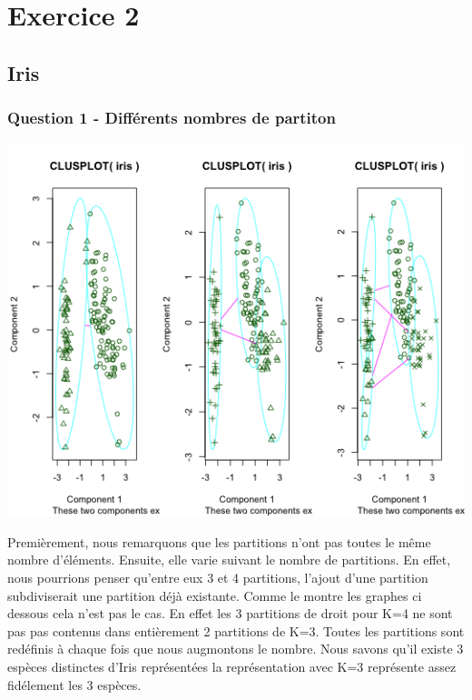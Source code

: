 \documentclass{article}\usepackage[]{graphicx}\usepackage[]{color}
\makeatletter
\newenvironment{kframe}{%
 \def\at@end@of@kframe{}%
 \ifinner\ifhmode%
  \def\at@end@of@kframe{\end{minipage}}%
  \begin{minipage}{\columnwidth}%
 \fi\fi%
 \def\FrameCommand##1{\hskip\@totalleftmargin \hskip-\fboxsep
 \colorbox{shadecolor}{##1}\hskip-\fboxsep
     \hskip-\linewidth \hskip-\@totalleftmargin \hskip\columnwidth}%
 \MakeFramed {\advance\hsize-\width
   \@totalleftmargin\z@ \linewidth\hsize
   \@setminipage}}%
 {\par\unskip\endMakeFramed%
 \at@end@of@kframe}
\newenvironment{knitrout}{}{} %
\makeatother
\begin{document}
\begin{knitrout}
\color{fgcolor}\begin{kframe}


{\ttfamily\noindent\bfseries{}}

{\ttfamily\noindent\bfseries\color{errorcolor}{\#\# Error in cmdscale(mutations): objet 'mutations' introuvable}}\end{kframe}
\end{knitrout}


\section*{Exercice 2} 



\subsection*{Iris}


\subsubsection*{Question 1 - Différents nombres de partiton}

\includegraphics[width=\textwidth]{ex2_iris_1.png}


Premièrement, nous remarquons que les partitions n'ont pas toutes le même nombre d'éléments. 
Ensuite, elle varie suivant le nombre de partitions. En effet, nous pourrions penser qu'entre eux 3 et 4 partitions, l'ajout d'une partition subdiviserait une partition déjà existante. Comme le montre les graphes ci dessous cela n'est pas le cas. En effet les 3 partitions de droit pour K=4 ne sont pas pas contenus dans entièrement 2 partitions de K=3. Toutes les partitions sont redéfinis à chaque fois que nous augmontons le nombre. 
Nous savons qu'il existe 3 espèces distinctes d'Iris représentées la représentation avec K=3 représente assez fidélement les 3 espèces. 
\end{document}
